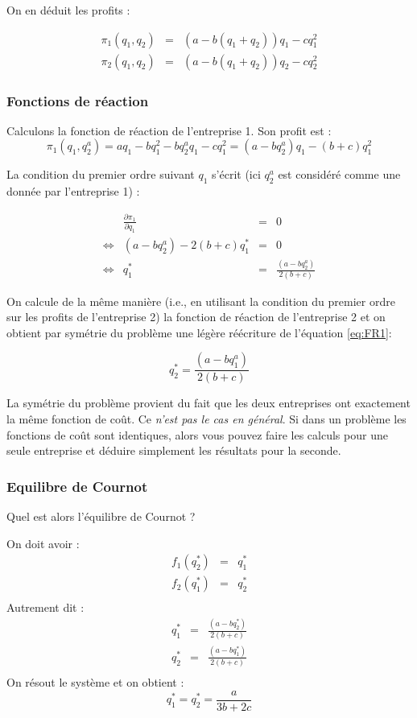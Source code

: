 \documentclass[
]{book}
\theoremstyle{definition}
\theoremstyle{definition}
\theoremstyle{definition}
\theoremstyle{definition}
\theoremstyle{remark}
\begin{document}
On en déduit les profits :

\[
\begin{array}{rcl}
\pi_1(q_1, q_2) &=& \left(a-b(q_1+q_2)\right)q_1-cq_1^2\\
\pi_2(q_1, q_2) &=& \left(a-b(q_1+q_2)\right)q_2-cq_2^2
\end{array}
\]

\hypertarget{fonctions-de-ruxe9action}{%
\subsubsection{Fonctions de réaction}\label{fonctions-de-ruxe9action}}

Calculons la fonction de réaction de l'entreprise 1.
Son profit est :
\[
\pi_1(q_1, q_2^a) = aq_1-bq_1^2-bq_2^aq_1-cq_1^2 = (a-bq_2^a)q_1-(b+c)q_1^2
\]

La condition du premier ordre suivant \(q_1\) s'écrit (ici \(q_2^a\) est considéré comme une donnée par l'entreprise 1) :

\[
\begin{array}{crcl}
&\frac{\partial \pi_1}{\partial q_1}&=&0\\
\Leftrightarrow & (a-bq_2^a)-2(b+c)q_1^* &=& 0\\
\Leftrightarrow & q_1^* &=& \frac{(a-bq_2^a)}{2(b+c)}
\label{eq:FR1}
\end{array}
\]

On calcule de la même manière (i.e., en utilisant la condition du premier ordre sur les profits de l'entreprise 2) la fonction de réaction de l'entreprise 2 et on obtient par symétrie du problème une légère réécriture de l'équation \eqref{eq:FR1}:

\[
q_2^* = \frac{(a-bq_1^a)}{2(b+c)}
\]

La symétrie du problème provient du fait que les deux entreprises ont exactement la même fonction de coût.
Ce \emph{n'est pas le cas en général}.
Si dans un problème les fonctions de coût sont identiques, alors vous pouvez faire les calculs pour une seule entreprise et déduire simplement les résultats pour la seconde.

\hypertarget{equilibre-de-cournot}{%
\subsubsection{Equilibre de Cournot}\label{equilibre-de-cournot}}

Quel est alors l'équilibre de Cournot ?

On doit avoir :
\[
\begin{array}{rcl}
f_1(q_2^*) &=& q_1^*\\
f_2(q_1^*) &=& q_2^*\\
\end{array}
\]
Autrement dit :
\[
\begin{array}{rcl}
q_1^* &=& \frac{(a-bq_2^*)}{2(b+c)} \\
q_2^* &=&\frac{(a-bq_1^*)}{2(b+c)}\\
\end{array}
\]
On résout le système et on obtient :
\[
q_1^*=q_2^* = \frac{a}{3b+2c}
\]
\end{document}
